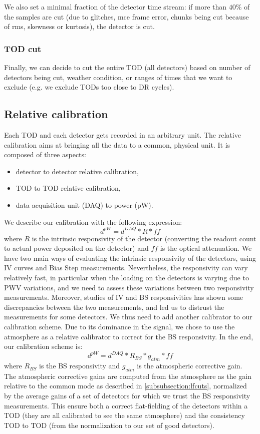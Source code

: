 \documentclass[a4paper, 11pt]{article}
\begin{document}
We also set a minimal fraction of the detector time stream: if more than $40\%$ of the samples are cut (due to glitches, mce frame error, chunks being cut because of rms, skewness or kurtosis), the detector is cut.

\subsubsection{TOD cut}
Finally, we can decide to cut the entire TOD (all detectors) based on number of detectors being cut, weather condition, or ranges of times that we want to exclude (e.g. we exclude TODs too close to DR cycles).

\subsection{Relative calibration}
\label{subsec:relcal}
Each TOD and each detector gets recorded in an arbitrary unit. The relative calibration aims at bringing all the data to a common, physical unit. It is composed of three aspects:
\begin{itemize}
	\item detector to detector relative calibration,
	\item TOD to TOD relative calibration,
	\item data acquisition unit (DAQ) to power (pW).
\end{itemize}
We describe our calibration with the following expression:
\begin{equation}
	d^{pW} = d^{DAQ} * R * ff
\end{equation}
where $R$ is the intrinsic responsivity of the detector (converting the readout count to actual power deposited on the detector) and $ff$ is the optical attenuation. We have two main ways of evaluating the intrinsic responsivity of the detectors, using IV curves and Bias Step measurements. Nevertheless, the responsivity can vary relatively fast, in particular when the loading on the detectors is varying due to PWV variations, and we need to assess these variations between two responsivity measurements. Moreover, studies of IV and BS responsivities has shown some discrepancies between the two measurements, and led us to distrust the measurements for some detectors. We thus need to add another calibrator to our calibration scheme. Due to its dominance in the signal, we chose to use the atmosphere as a relative calibrator to correct for the BS responsivity. In the end, our calibration scheme is:
\begin{equation}
	d^{pW} = d^{DAQ} * R_{BS} * g_{atm} * ff
\end{equation}
where $R_{BS}$ is the BS responsivity and $g_{atm}$ is the atmospheric corrective gain. The atmospheric corrective gains are computed from the atmosphere as the gain relative to the common mode as described in \ref{subsubsection:lfcuts}, normalized by the average gains of a set of detectors for which we trust the BS responsivity measurements. This ensure both a correct flat-fielding of the detectors within a TOD (they are all calibrated to see the same atmosphere) and the consistency TOD to TOD (from the normalization to our set of good detectors).
	
\end{document}
